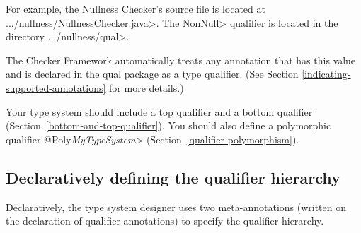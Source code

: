 For example, the Nullness Checker's source file is located at
\<.../nullness/NullnessChecker.java>. The \<NonNull> qualifier is located in the
directory \<.../nullness/qual>.

The Checker Framework automatically treats any annotation that has this value
and is declared in the qual package as a type qualifier.
(See Section \ref{indicating-supported-annotations} for more details.)


Your type system should include a top qualifier and a bottom qualifier
(Section~\ref{bottom-and-top-qualifier}).  You should also define a
polymorphic qualifier \<@Poly\emph{MyTypeSystem}>
(Section~\ref{qualifier-polymorphism}).


\subsection{Declaratively defining the qualifier hierarchy\label{declarative-hierarchy}}

Declaratively, the type system designer uses two meta-annotations (written
on the declaration of qualifier annotations) to specify the qualifier
hierarchy.

